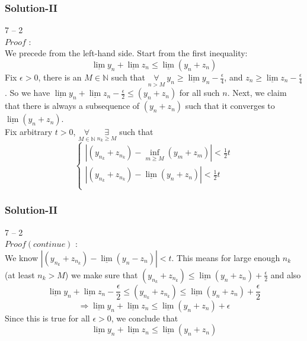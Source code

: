 \documentclass[12pt, t]{beamer}
\begin{document}
\begin{frame}
    \frametitle{Solution-II}
7 -- 2\\
$Proof$ : \\
\hspace{1em} We precede from the left-hand side. Start from the first inequality: 
\begin{equation*}
    \underline{\lim}y_n+\underline{\lim}z_n\leq \underline{\lim} (y_n+z_n) 
\end{equation*}
\hspace{1em} Fix $\epsilon>0$, there is an $M\in \mathbb{N}$ such that $\underset{n>M}{\forall}\ y_n\geq \underline{\lim}y_n-\frac{\epsilon}{4}$, and 
$z_n \geq \underline{\lim}z_n-\frac{\epsilon}{4}$. So we have $\underline{\lim}y_n+\underline{\lim}z_n-\frac{\epsilon}{2}\leq(y_n+z_n)$ for all such $n$. 
Next, we claim that there is always a subsequence of $(y_n+z_n)$ such that it converges to $\underline{\lim}(y_n+z_n)$.\\
\hspace{1em} Fix arbitrary $t>0$, $\underset{M\in\mathbb{N}}{\forall}\ \underset{n_k\geq M}{\exists}$ such that 
\begin{equation*}
    \begin{cases}
    |(y_{n_k}+z_{n_k})-\inf_{m\geq M}(y_m+z_m)|<\frac{1}{2}t\\
    |(y_{n_k}+z_{n_k})-\underline{\lim}(y_n+z_n)|<\frac{1}{2}t\\
\end{cases}
\end{equation*}
 

\end{frame}

\begin{frame}
    \frametitle{Solution-II}
7 -- 2\\
$Proof(continue)$ : \\
\hspace{1em} We know $|(y_{n_k}+z_{n_k})-\underline{\lim}(y_n-z_n)|<t$. This means for large enough $n_k$ (at least $n_k>M$) we make sure that 
$(y_{n_k}+z_{n_k})\leq \underline{\lim}(y_n+z_n)+\frac{\epsilon}{2}$ and also 
\begin{equation*}
        \underline{\lim}y_n+\underline{\lim}z_n-\frac{\epsilon}{2}\leq (y_{n_k}+z_{n_k})\leq \underline{\lim}(y_n+z_n)+\frac{\epsilon}{2}
\end{equation*}
\begin{equation*}
    \Rightarrow \underline{\lim}y_n+\underline{\lim}z_n\leq \underline{\lim}(y_n+z_n)+\epsilon
\end{equation*}
\hspace{1em} Since this is true for all $\epsilon>0$, we conclude that
\begin{equation*}
    \underline{\lim}y_n+\underline{\lim}z_n\leq \underline{\lim}(y_n+z_n)
\end{equation*}

\end{frame}
\end{document}
